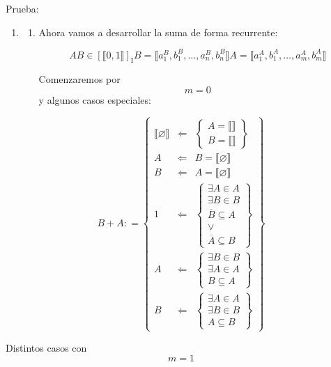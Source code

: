 \begin{enumerate}
  Prueba:

  \begin{enumerate}
  \def\labelenumii{\arabic{enumii}.}
  \item
    \begin{enumerate}
    \def\labelenumiii{\arabic{enumiii}.}
    \item
      Ahora vamos a desarrollar la suma de forma recurrente:

      \[A{B \in \left\lbrack {⟦0,1⟧} \right\rbrack_{\mathbf{\mathrm{I}}}}{B = {⟦{a_{1}^{B},b_{1}^{B},\ldots,a_{n}^{B},b_{n}^{B}}⟧}}{A = {⟦{a_{1}^{A},b_{1}^{A},\ldots,a_{m}^{A},b_{m}^{A}}⟧}}\]

      Comenzaremos por \[m = 0\]y algunos casos especiales:
    \end{enumerate}
  \end{enumerate}

  \[{{B + A}{: =}}\begin{Bmatrix}
  {⟦\varnothing ⟧} & {\Leftarrow} & \begin{Bmatrix}
  {A = {⟦⟧}} \\
  {B = {⟦⟧}}
  \end{Bmatrix} \\
  A & {\Leftarrow} & {B = {⟦\varnothing ⟧}} \\
  B & {\Leftarrow} & {A = {⟦\varnothing ⟧}} \\
  1 & {\Leftarrow} & \begin{Bmatrix}
  {\exists{A \in A}} \\
  {\exists{B \in B}} \\
  {\overline{B} \subseteq A} \\
   \vee \\
  {\overline{A} \subseteq B}
  \end{Bmatrix} \\
  A & {\Leftarrow} & \begin{Bmatrix}
  {\exists{B \in B}} \\
  {\exists{A \in A}} \\
  {B \subseteq A}
  \end{Bmatrix} \\
  B & {\Leftarrow} & \begin{Bmatrix}
  {\exists{A \in A}} \\
  {\exists{B \in B}} \\
  {A \subseteq B}
  \end{Bmatrix}
  \end{Bmatrix}\]

  Distintos casos con \[m = 1\]


\end{enumerate}
